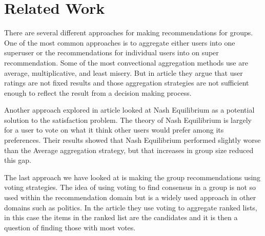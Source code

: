\section{Related Work} \label{in:related_work}

There are several different approaches for making recommendations for groups. One of the most common approaches is to aggregate either users into one superuser or the recommendations for individual users into on super recommendation\cite{recsyshandbookagreggation}\cite{deCampos2009}\cite{Christensen201114127}. Some of the most convectional aggregation methods use are average, multiplicative, and least misery. But in article \cite{aggregationnotenough} they argue that user ratings are not fixed results and those aggregation strategies are not sufficient enough to reflect the result from a decision making process.

Another approach explored in article \cite{nashequilibrium} looked at Nash Equilibrium as a potential solution to the satisfaction problem. The theory of Nash Equilibrium is largely for a user to vote on what it think other users would prefer among its preferences. Their results showed that Nash Equilibrium performed slightly worse than the Average aggregation strategy, but that increases in group size reduced this gap.

The last approach we have looked at is making the group recommendations using voting strategies\cite{baltrunas}\cite{Popescu2013}. The idea of using voting to find consensus in a group is not so used within the recommendation domain but is a widely used approach in other domains such as politics. In the article \cite{baltrunas} they use voting to aggregate ranked lists, in this case the items in the ranked list are the candidates and it is then a question of finding those with most votes. 






